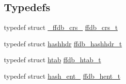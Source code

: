 \subsection*{Typedefs}
\begin{DoxyCompactItemize}
\item 
typedef struct \mbox{\hyperlink{struct__ffdb__crs__}{\+\_\+ffdb\+\_\+crs\+\_\+}} \mbox{\hyperlink{adat-devel_2other__libs_2filedb_2filehash_2ffdb__hash_8h_a103d84beefb6d7306cb252c4d7f25479}{ffdb\+\_\+crs\+\_\+t}}
\item 
typedef struct \mbox{\hyperlink{structhashhdr}{hashhdr}} \mbox{\hyperlink{adat-devel_2other__libs_2filedb_2filehash_2ffdb__hash_8h_aab0f28f6f6872895710d2edc192c8d3a}{ffdb\+\_\+hashhdr\+\_\+t}}
\item 
typedef struct \mbox{\hyperlink{structhtab}{htab}} \mbox{\hyperlink{adat-devel_2other__libs_2filedb_2filehash_2ffdb__hash_8h_ae592010ed2bedc975d3cc0b7d074b9d1}{ffdb\+\_\+htab\+\_\+t}}
\item 
typedef struct \mbox{\hyperlink{structhash__ent__}{hash\+\_\+ent\+\_\+}} \mbox{\hyperlink{adat-devel_2other__libs_2filedb_2filehash_2ffdb__hash_8h_aa1cea5ccbd6513ed152988f7a71a936d}{ffdb\+\_\+hent\+\_\+t}}
\end{DoxyCompactItemize}
